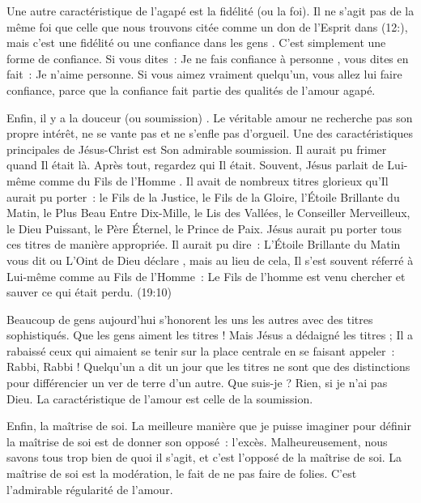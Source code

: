Une autre caractéristique de l'agapé est la fidélité (ou la foi).
 Il ne s'agit pas de la même foi que celle que nous trouvons citée
 comme un don de l'Esprit dans (12:),
 mais c'est une fidélité ou une confiance dans les gens
 .
 C'est simplement une forme de confiance. Si vous dites~:
 \og Je ne fais confiance à personne \fg{}, vous dites en fait~:
 \og Je n'aime personne. \fg{}
 Si vous aimez vraiment quelqu'un, vous allez lui faire confiance,
 parce que la confiance fait partie des qualités de l'amour agapé.

Enfin, il y a la douceur (ou soumission)
 .
 Le véritable amour ne recherche pas son propre intérêt,
 ne se vante pas et ne s'enfle pas d'orgueil.
 Une des caractéristiques principales de Jésus-Christ
 est Son admirable soumission. Il aurait pu frimer quand Il était là.
 Après tout, regardez qui Il était. Souvent, Jésus parlait de Lui-même
 comme du \og Fils de l'Homme \fg{}.
 Il avait de nombreux titres glorieux qu'Il aurait pu porter~:
 le Fils de la Justice, le Fils de la Gloire, l'Étoile Brillante du Matin,
 le Plus Beau Entre Dix-Mille, le Lis des Vallées,
 le Conseiller Merveilleux, le Dieu Puissant, le Père Éternel,
 le Prince de Paix. Jésus aurait pu porter tous ces titres
 de manière appropriée. Il aurait pu dire~:
 \og L'Étoile Brillante du Matin vous dit \fg{} ou
 \og L'Oint de Dieu déclare \fg{}, mais au lieu de cela,
 Il s'est souvent réferré à Lui-même comme au Fils de l'Homme~:
 \og Le Fils de l'homme est venu chercher et sauver
 ce qui était perdu. \fg{} (19:10)

Beaucoup de gens aujourd'hui s'honorent les uns les autres
 avec des titres sophistiqués. Que les gens aiment les titres !
 Mais Jésus a dédaigné les titres ; Il a rabaissé ceux qui aimaient
 se tenir sur la place centrale en se faisant appeler~:
 \og Rabbi, Rabbi ! \fg{}
 Quelqu'un a dit un jour que les titres ne sont que des distinctions
 pour différencier un ver de terre d'un autre. Que suis-je ?
 Rien, si je n'ai pas Dieu. La caractéristique de l'amour
 est celle de la soumission.

Enfin, la maîtrise de soi. La meilleure manière que je puisse imaginer
 pour définir la maîtrise de soi est de donner son opposé~: l'excès.
 Malheureusement, nous savons tous trop bien de quoi il s'agit,
 et c'est l'opposé de la maîtrise de soi.
 La maîtrise de soi est la modération, le fait de ne pas faire de folies.
 C'est l'admirable régularité de l'amour.


